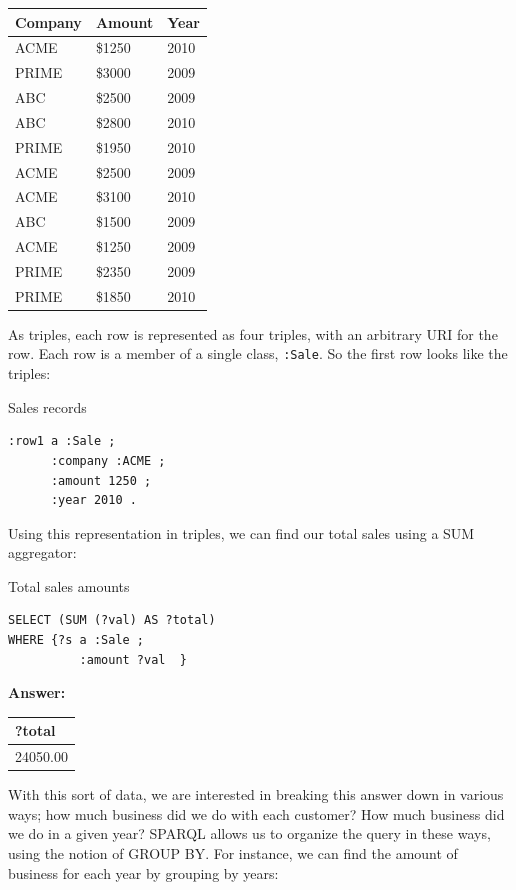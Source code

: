 \begin{tabular}{|lll|}
\hline
Company&Amount&Year\\
\hline
ACME&\$1250&2010\\
PRIME&\$3000&2009\\
ABC&\$2500&2009\\
ABC&\$2800&2010\\
PRIME&\$1950&2010\\
ACME&\$2500&2009\\
ACME&\$3100&2010\\
ABC&\$1500&2009\\
ACME&\$1250&2009\\
PRIME&\$2350&2009\\
PRIME&\$1850&2010\\
\hline
\end{tabular}


As triples, each row is represented as four triples, with an arbitrary
URI for the row. Each row is a member of a single class, \texttt{:Sale}. So the
first row looks like the triples:

\begin{query}Sales records\end{query}
\begin{lstlisting}
:row1 a :Sale ;
      :company :ACME ;
      :amount 1250 ;
      :year 2010 .
\end{lstlisting}

Using this representation in triples, we can find our total sales using
a SUM aggregator:

\begin{query}Total sales amounts\end{query}

\begin{lstlisting}
SELECT (SUM (?val) AS ?total)
WHERE {?s a :Sale ;
          :amount ?val  }
\end{lstlisting}

\textbf{\textbf{Answer:}}

\begin{tabular}{|l|}
\hline
?total\\
\hline
24050.00\\
\hline
\end{tabular}

With this sort of data, we are interested in breaking this answer down
in various ways; how much business did we do with each customer? How
much business did we do in a given year? SPARQL allows us to organize
the query in these ways, using the notion of GROUP BY. For instance, we
can find the amount of business for each year by grouping by years:

